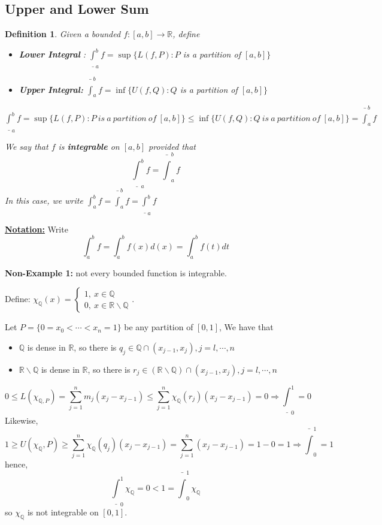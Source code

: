 \documentclass[12pt]{article}
\theoremstyle{plain}
\newtheorem{definition}{Definition}[subsection]
\begin{document}
	\newpage
	\subsection{Upper and Lower Sum}

	\begin{definition}
		Given a bounded $f:[a,b]\to\mathbb{R}$, define 
		\begin{itemize}
			\item \textbf{Lower Integral} : 
				$\underline{\int}_a^b f
				= \sup \{L(f,P): P $ is a partition of $[a,b]\}$
			\item \textbf{Upper Integral:}
				$\bar{\int}_a^b f 
				= \inf \{U(f,Q): Q$ is a partition of $[a,b]\}$
		\end{itemize}
		$\underline{\int}_a^b f
		=\sup \{L(f,P): P \ is\ a\ partition \ of \ [a,b]\}
		\leq \inf \{U(f,Q): Q\ is \ a \ partition \ of \ [a,b]\} 
		=\bar{\int}_a^b f$
	
		We say that $f$ is \textbf{integrable} on $[a,b]$ provided that 
		\[
			\underline{\int}_a^b f = \bar{\int}_a^b f
		\]
		In this case, we write $\int _a^b f =  \bar{\int}_a^b f
		=\underline{\int}_a^b f$
	\end{definition}

	\underline{\textbf{Notation:}} Write 
	\[
		\int_a^b f = \int _a^b f(x)d(x) = \int_a^b f(t) dt
	\]
	
	\vspace{0.5 in}
	{\color{Brown}
	\textbf{Non-Example 1: } not every bounded function is integrable. 
		
	Define: $\chi_{\mathbb{Q}}(x) = \begin{cases}
		1, \ x\in \mathbb{Q}\\
		0, \ x\in \mathbb{R}\backslash \mathbb{Q}
	\end{cases}$.
	
	Let $P=\{0=x_0<\cdots<x_n=1\}$ be any partition of $[0,1]$, 
	We have that 
	\begin{itemize}
		\item $\mathbb{Q}$ is dense in $\mathbb{R}$, so there is 
			 $q_j\in  \mathbb{Q} \cap(x_{j-1},x_j), j = l,\cdots, n$

		\item $\mathbb{R} \backslash \mathbb{Q}$ is dense in $\mathbb{R}$, 
			so there is $r_j\in (\mathbb{R}\backslash \mathbb{Q})
			\cap(x_{j-1},x_j), j = l,\cdots, n$
	\end{itemize}
	\[
		0\leq L(\chi_{\mathbb{Q},P}) = \sum_{j=1}^n m_j(x_j-x_{j-1})\leq 
		\sum_{j=1}^n \chi_{\mathbb{Q}}(r_j)(x_j-x_{j-1})=0
		\Rightarrow \underline{\int}_0^1 = 0
	\]
	Likewise, 
	\[
		1\geq U(\chi_{\mathbb{Q}},P)\geq \sum_{j=1}^n \chi_{\mathbb{Q}}(q_j)
		(x_j-x_{j-1}) =\sum_{j=1}^n (x_j-x_{j-1}) = 1-0=1 
		\Rightarrow \bar{\int}_0^1 = 1
	\]
	hence, 
	\[
		\underline{\int}_0^1 \chi_{\mathbb{Q}} = 0 < 1
		= \bar{\int}_0^1 \chi_{\mathbb{Q}} 
	\]
	so $\chi_{\mathbb{Q}}$ is not integrable on $[0,1]$.
	}
\end{document}
